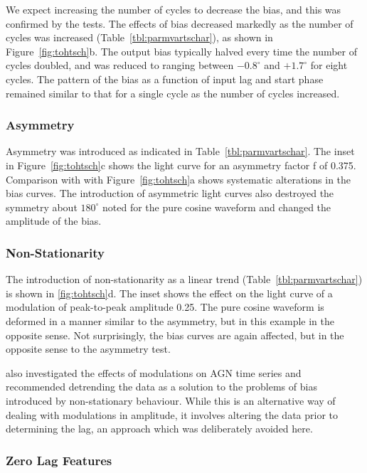 \documentclass[usenatbib,usegraphicx]{mn2e}
\begin{document}
We expect increasing the number of cycles to decrease the bias, and
this was confirmed by the tests.  
The effects of bias decreased markedly as the number of cycles 
was increased (Table~\ref{tbl:parmvartschar}), 
as shown in Figure~\ref{fig:tohtsch}b.  
The output bias typically halved every time the number of cycles doubled,
and was reduced to ranging between
$-0.8^\circ$ and $+1.7^\circ$ for eight cycles.  
The pattern of the bias as a function of input
lag and start phase remained similar to that for a single cycle as the
number of cycles increased.


\subsubsection{Asymmetry}

Asymmetry was introduced as indicated in Table~\ref{tbl:parmvartschar}.  The
inset in Figure~\ref{fig:tohtsch}c shows the light curve for an asymmetry
factor f of 0.375.  Comparison with with Figure~\ref{fig:tohtsch}a shows
systematic alterations in the bias curves.  The introduction of asymmetric
light curves also destroyed the symmetry about $180^\circ$ noted for the
pure cosine waveform and changed the amplitude of the bias.

\subsubsection{Non-Stationarity}

The introduction of non-stationarity as a linear trend
(Table~\ref{tbl:parmvartschar}) is shown in \ref{fig:tohtsch}d.  The inset
shows the effect on the light curve of a modulation of peak-to-peak
amplitude 0.25.  The pure cosine waveform is deformed in a manner similar to
the asymmetry, but in this example in the opposite sense.  Not surprisingly,
the bias curves are again affected, but in the opposite sense to the
asymmetry test.

\citet{Welsh99} also investigated the effects of modulations on AGN time series
and recommended detrending the data as a
solution to the problems of bias introduced by non-stationary behaviour. 
While this is an alternative way of dealing with modulations
in amplitude, it involves altering the data prior to determining the lag,
an approach which was deliberately avoided here.

\subsubsection{Zero Lag Features}
\end{document}
